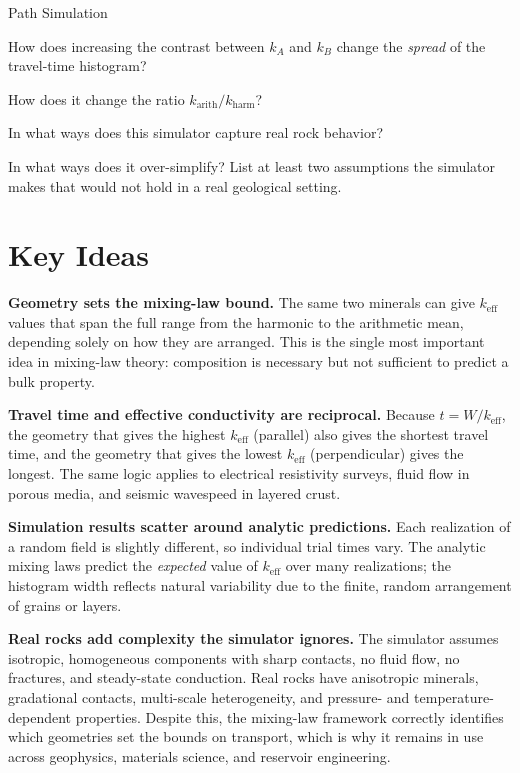 \begin{activity}[Demo]{Path Simulation}
\begin{questions}
        How does increasing the contrast between $k_A$ and $k_B$ change the \emph{spread} of the travel-time histogram?

        How does it change the ratio $k_\text{arith} / k_\text{harm}$?
        \answerbox[4cm]

        In what ways does this simulator capture real rock behavior?
        \answerbox[3cm]

        In what ways does it over-simplify?  List at least two assumptions the simulator makes that would not hold in a real geological setting.
        \answerbox[3cm]
\end{questions}

\section*{Key Ideas}

\textbf{Geometry sets the mixing-law bound.}  The same two minerals can give $k_\text{eff}$ values that span the full range from the harmonic to the arithmetic mean, depending solely on how they are arranged.  This is the single most important idea in mixing-law theory: composition is necessary but not sufficient to predict a bulk property.

\textbf{Travel time and effective conductivity are reciprocal.} Because $t = W/k_\text{eff}$, the geometry that gives the highest $k_\text{eff}$ (parallel) also gives the shortest travel time, and the geometry that gives the lowest $k_\text{eff}$ (perpendicular) gives the longest.  The same logic applies to electrical resistivity surveys, fluid flow in porous media, and seismic wavespeed in layered crust.

\textbf{Simulation results scatter around analytic predictions.} Each realization of a random field is slightly different, so individual trial times vary.  The analytic mixing laws predict the \emph{expected} value of $k_\text{eff}$ over many realizations; the histogram width reflects natural variability due to the finite, random arrangement of grains or layers.

\textbf{Real rocks add complexity the simulator ignores.}  The simulator assumes isotropic, homogeneous components with sharp contacts, no fluid flow, no fractures, and steady-state conduction.  Real rocks have anisotropic minerals, gradational contacts, multi-scale heterogeneity, and pressure- and temperature-dependent properties.  Despite this, the mixing-law framework correctly identifies which geometries set the bounds on transport, which is why it remains in use across geophysics, materials science, and reservoir engineering.

\end{activity}
